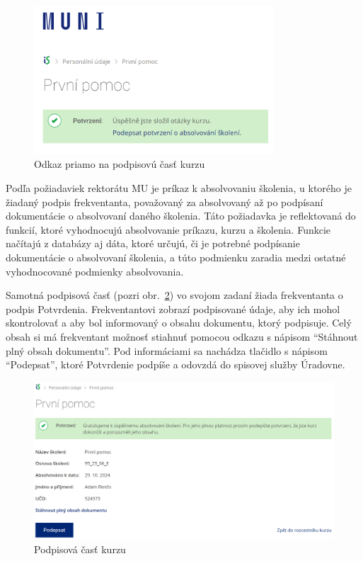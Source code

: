 \documentclass[
  digital,     %
  oneside,     %
  nosansbold,  %
  nocolorbold, %
  lof,         %
  nolot,         %
]{fithesis4}
\begin{document}
\begin{figure}
  \begin{center}
    \includegraphics[width=0.8\textwidth]{odkaznapodpis.png}
  \end{center}
  \caption{Odkaz priamo na podpisovú časť kurzu}
  \label{obr2}
\end{figure}

Podľa požiadaviek rektorátu MU je príkaz k absolvovaniu školenia, u ktorého je žiadaný podpis frekventanta, považovaný za absolvovaný až po podpísaní dokumentácie o absolvovaní daného školenia. Táto požiadavka je reflektovaná do funkcií, ktoré vyhodnocujú absolvovanie príkazu, kurzu a školenia. Funkcie načítajú z databázy aj dáta, ktoré určujú, či je potrebné podpísanie dokumentácie o absolvovaní školenia, a túto podmienku zaradia medzi ostatné vyhodnocované podmienky absolvovania.

Samotná podpisová časť (pozri obr.~\ref{obr3}) vo svojom zadaní žiada frekventanta o podpis Potvrdenia. Frekventantovi zobrazí podpisované údaje, aby ich mohol skontrolovať a aby bol informovaný o obsahu dokumentu, ktorý podpisuje. Celý obsah si má frekventant možnosť stiahnuť pomocou odkazu s nápisom \enquote{Stáhnout plný obsah dokumentu}. Pod informáciami sa nachádza tlačidlo s nápisom \enquote{Podepsat}, ktoré Potvrdenie podpíše a odovzdá do spisovej služby Úradovne.

\begin{figure}
  \begin{center}
    \includegraphics[width=\textwidth]{podpiscast2.png}
  \end{center}
  \caption{Podpisová časť kurzu}
  \label{obr3}
\end{figure}
\end{document}
